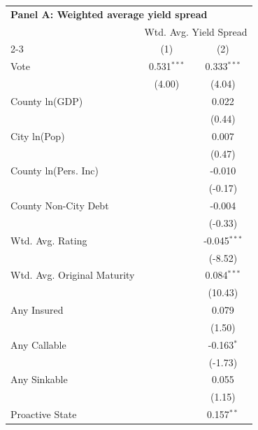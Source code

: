 \begingroup
\centering
\begin{tabular*}{\textwidth}{@{\extracolsep{\fill}}lcc}
\multicolumn{3}{l}{\textbf{Panel A: Weighted average yield spread}}\\

\addlinespace
   \toprule
    & \multicolumn{2}{c}{Wtd. Avg. Yield Spread}\\
   \cmidrule(lr){2-3}
                               & (1)           & (2)\\  
   \midrule 
   Vote                        & 0.531$^{***}$ & 0.333$^{***}$\\   
                               & (4.00)       & (4.04)\\   
   County ln(GDP)              &               & 0.022\\   
                               &               & (0.44)\\   
   City ln(Pop)                &               & 0.007\\   
                               &               & (0.47)\\   
   County ln(Pers. Inc)        &               & -0.010\\   
                               &               & (-0.17)\\   
   County Non-City Debt        &               & -0.004\\   
                               &               & (-0.33)\\   
   Wtd. Avg. Rating            &               & -0.045$^{***}$\\   
                               &               & (-8.52)\\   
   Wtd. Avg. Original Maturity &               & 0.084$^{***}$\\   
                               &               & (10.43)\\   
   Any Insured                 &               & 0.079\\   
                               &               & (1.50)\\   
   Any Callable                &               & -0.163$^{*}$\\   
                               &               & (-1.73)\\   
   Any Sinkable                &               & 0.055\\   
                               &               & (1.15)\\   
   Proactive State             &               & 0.157$^{**}$\\   

\end{tabular*}
